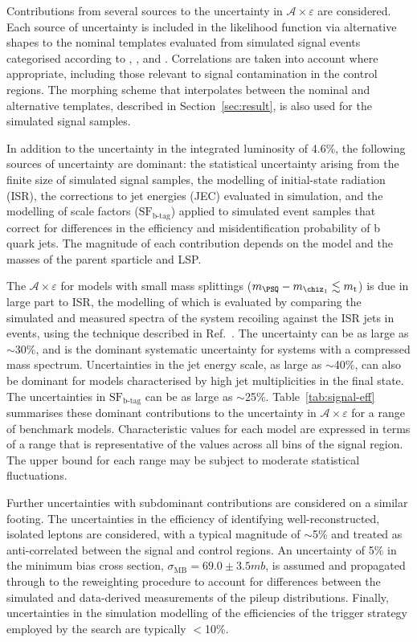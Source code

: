 Contributions from several sources to the uncertainty in
$\mathcal{A}\times\varepsilon$ are considered. Each source of
uncertainty is included in the likelihood function via alternative
shapes to the nominal \HTmiss templates evaluated from simulated
signal events categorised according to \njet, \nb, and
\scalht. Correlations are taken into account where appropriate,
including those relevant to signal contamination in the control
regions. The morphing scheme that interpolates between the nominal and
alternative \HTmiss templates, described in Section~\ref{sec:result},
is also used for the simulated signal samples.

In addition to the uncertainty in the integrated luminosity of
4.6\%, %
the following sources of uncertainty are dominant: the statistical
uncertainty arising from the finite size of simulated signal samples,
the modelling of initial-state radiation (ISR), the corrections to jet
energies (JEC) evaluated in simulation, and the modelling of scale
factors ($\text{SF}_\text{b-tag}$) applied to simulated event samples
that correct for differences in the efficiency and misidentification
probability of b quark jets. The magnitude of each contribution
depends on the model and the masses of the parent sparticle and LSP.

The $\mathcal{A}\times\varepsilon$ for models with small mass
splittings (\eg $m_{\PSQ} - m_{\chiz_1} \lesssim m_{\text t}$) is due
in large part to ISR, the modelling of which is evaluated by comparing
the simulated and measured \Pt spectra of the system recoiling against
the ISR jets in \ttbar events, using the technique described in
Ref.~\cite{single-lepton-stop}. The uncertainty can be as large as
$\sim$30\%, and is the dominant systematic uncertainty for systems
with a compressed mass spectrum. Uncertainties in the jet energy
scale, as large as $\sim$40\%, can also be dominant for models
characterised by high jet multiplicities in the final state. The
uncertainties in $\text{SF}_\text{b-tag}$ can be as large as
$\sim$25\%. Table~\ref{tab:signal-eff} summarises these dominant
contributions to the uncertainty in $\mathcal{A}\times\varepsilon$ for
a range of benchmark models. Characteristic values for each model are
expressed in terms of a range that is representative of the values
across all bins of the signal region. The upper bound for each range
may be subject to moderate statistical fluctuations. 

Further uncertainties with subdominant contributions are considered on
a similar footing. The uncertainties in the efficiency of identifying
well-reconstructed, isolated leptons are considered, with a typical
magnitude of $\sim$5\% and treated as anti-correlated between the
signal and control regions. An uncertainty of 5\% in the minimum bias
cross section, $\sigma_\text{MB} = 69.0 \pm 3.5\unit{mb}$, is assumed
and propagated through to the reweighting procedure to account for
differences between the simulated and data-derived measurements of the
pileup distributions. Finally, uncertainties in the simulation
modelling of the efficiencies of the trigger strategy employed by the
search are typically $<$10\%.

